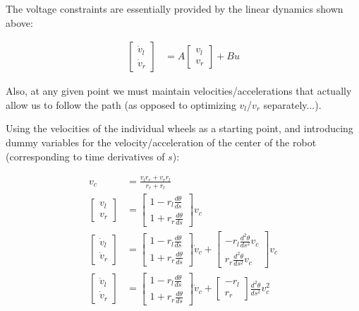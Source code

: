 \documentclass{article}
\begin{document}
The voltage constraints are essentially provided by the linear dynamics shown
above:

\begin{align}
\begin{bmatrix} \dot{v}_l \\ \dot{v}_r \end{bmatrix} &=
   A \begin{bmatrix} v_l \\ v_r \end{bmatrix} + B u
\end{align}

Also, at any given point we must maintain velocities/accelerations that actually
allow us to follow the path (as opposed to optimizing $v_l$/$v_r$ separately...).

Using the velocities of the individual wheels as a starting point, and
introducing dummy variables for the velocity/acceleration of the center of the
robot (corresponding to time derivatives of $s$):

\begin{align*}
v_c &= \frac{v_l  r_r + v_r  r_l}{r_r + r_l} \\
\begin{bmatrix} v_l \\ v_r \end{bmatrix} &=
    \begin{bmatrix} 1 - r_l \frac{d\theta}{ds} \\ 1 + r_r \frac{d\theta}{ds}
\end{bmatrix} v_c \\
\begin{bmatrix} \dot{v}_l \\ \dot{v}_r \end{bmatrix} &=
  \begin{bmatrix} 1 - r_l \frac{d\theta}{ds} \\ 1 + r_r \frac{d\theta}{ds}
  \end{bmatrix} \dot{v}_c +   \begin{bmatrix} - r_l \frac{d^2\theta}{ds^2} v_c
  \\  r_r \frac{d^2\theta}{ds^2} v_c \end{bmatrix} v_c \\
\begin{bmatrix} \dot{v}_l \\ \dot{v}_r \end{bmatrix} &=
  \begin{bmatrix} 1 - r_l \frac{d\theta}{ds} \\ 1 + r_r \frac{d\theta}{ds}
  \end{bmatrix} \dot{v}_c +   \begin{bmatrix} -r_l \\ r_r \end{bmatrix} \frac{d^2\theta}{ds^2} v_c^2 \\
\end{align*}
\end{document}
